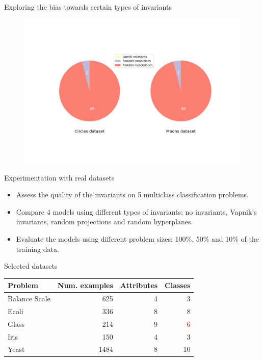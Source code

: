 \documentclass[10pt, dvipsnames]{beamer}
\begin{document}
\begin{frame}{Exploring the bias towards certain types of invariants}
    \begin{figure}
        \centering
        \includegraphics[width=\textwidth]{thesis/Figures/mean_num_selected.png}
    \end{figure}
\end{frame}

\begin{frame}{Experimentation with real datasets}
    \begin{itemize}
        \item<1-> Assess the quality of the invariants on 5 multiclass classification problems.
        \item<2-> Compare 4 models using different types of invariants: no invariants,
        Vapnik's invariants, random projections and random hyperplanes.
        \item<3-> Evaluate the models using different problem sizes: 100\%, 50\% and 10\% of the
        training data.
    \end{itemize}
\end{frame}


\begin{frame}{Selected datasets}

\begin{table}[H]
\centering
\begin{tabular}{lrrr}
\textbf{Problem} & \textbf{Num. examples} & \textbf{Attributes} & \textbf{Classes} \\ \hline
Balance Scale    & 625                    & 4                   & 3                \\
Ecoli            & 336                    & 8                   & 8                \\
Glass            & 214                    & 9                   & \textcolor{red}{6} \\
Iris             & 150                    & 4                   & 3                \\
Yeast            & 1484                   & 8                   & 10              
\end{tabular}
\end{table}
    
\end{frame}
\end{document}
